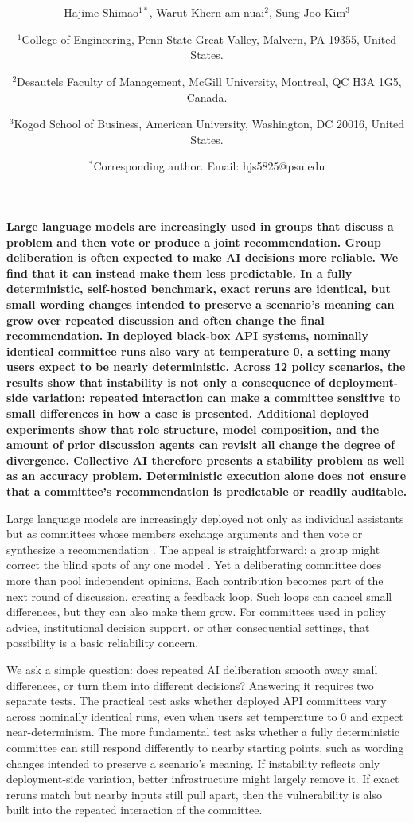 \documentclass[12pt]{article}
\date{}
\title{\bfseries \boldmath \scititle}
\author{
  Hajime Shimao$^{1\ast}$,
  Warut Khern-am-nuai$^{2}$,
  Sung Joo Kim$^{3}$\and
  \small$^{1}$College of Engineering, Penn State Great Valley, Malvern, PA 19355, United States.\and
  \small$^{2}$Desautels Faculty of Management, McGill University, Montreal, QC H3A 1G5, Canada.\and
  \small$^{3}$Kogod School of Business, American University, Washington, DC 20016, United States.\and
  \small$^{\ast}$Corresponding author. Email: hjs5825@psu.edu
}
\renewenvironment{abstract}{\quotation}{\endquotation}
\begin{document}
\maketitle

\begin{abstract}\bfseries\boldmath
Large language models are increasingly used in groups that discuss a problem
and then vote or produce a joint recommendation. Group deliberation is often
expected to make AI decisions more reliable. We find that it can instead make
them less predictable. In a fully deterministic, self-hosted benchmark, exact
reruns are identical, but small wording changes intended to preserve a scenario's
meaning can grow over repeated discussion and often change the final
recommendation. In deployed black-box API systems, nominally identical
committee runs also vary at temperature 0, a setting many users expect to be
nearly deterministic. Across 12 policy scenarios, the results show that
instability is not only a consequence of deployment-side variation: repeated
interaction can make a committee sensitive to small differences in how a case
is presented. Additional deployed experiments show that role structure, model
composition, and the amount of prior discussion agents can revisit all change
the degree of divergence. Collective AI therefore presents a stability problem
as well as an accuracy problem. Deterministic execution alone does not ensure
that a committee's recommendation is predictable or readily auditable.
\end{abstract}

\noindent
Large language models are increasingly deployed not only as individual
assistants but as committees whose members exchange arguments and then vote or
synthesize a recommendation \cite{wu2023autogen,chen2023agentverse,li2023camel,hong2023metagpt,park2023generative}.
The appeal is straightforward: a group might correct the blind spots of any one
model \cite{lee2025reliable,huangresilience}. Yet a deliberating committee does
more than pool independent opinions. Each contribution becomes part of the next
round of discussion, creating a feedback loop. Such loops can cancel small
differences, but they can also make them grow. For committees used in policy
advice, institutional decision support, or other consequential settings, that
possibility is a basic reliability concern.

We ask a simple question: does repeated AI deliberation smooth away small
differences, or turn them into different decisions? Answering it requires two
separate tests. The practical test asks whether deployed API committees vary
across nominally identical runs, even when users set temperature to 0 and expect
near-determinism. The more fundamental test asks whether a fully deterministic
committee can still respond differently to nearby starting points, such as
wording changes intended to preserve a scenario's meaning. If instability reflects
only deployment-side variation, better infrastructure might largely remove it.
If exact reruns match but nearby inputs still pull apart, then the vulnerability
is also built into the repeated interaction of the committee.
\end{document}
